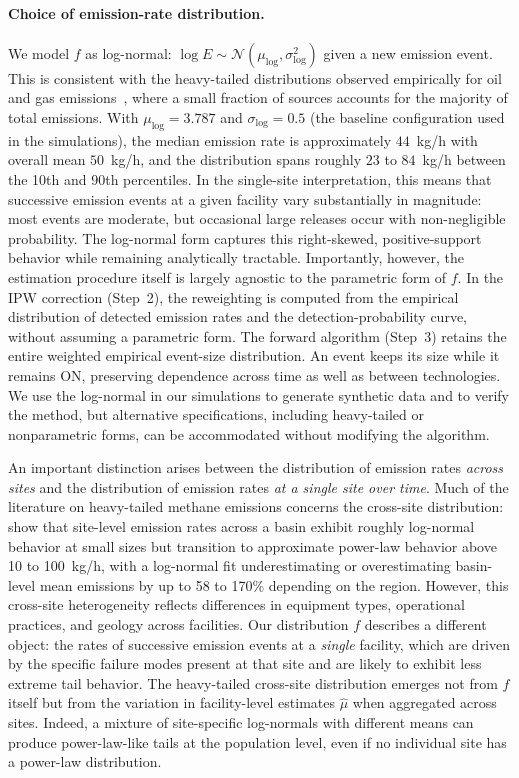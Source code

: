 \documentclass[11pt]{article}
\begin{document}
\paragraph{Choice of emission-rate distribution.}
We model $f$ as log-normal: $\log E \sim \mathcal{N}(\mu_{\log}, \sigma_{\log}^2)$ given a new emission event. This is consistent with the heavy-tailed distributions observed empirically for oil and gas emissions~\citep{Brandt2016, ZavalaAraiza2015}, where a small fraction of sources accounts for the majority of total emissions. With $\mu_{\log} = 3.787$ and $\sigma_{\log} = 0.5$ (the baseline configuration used in the simulations), the median emission rate is approximately $44$~kg/h with overall mean $50$~kg/h, and the distribution spans roughly $23$ to $84$~kg/h between the 10th and 90th percentiles. In the single-site interpretation, this means that successive emission events at a given facility vary substantially in magnitude: most events are moderate, but occasional large releases occur with non-negligible probability. The log-normal form captures this right-skewed, positive-support behavior while remaining analytically tractable. Importantly, however, the estimation procedure itself is largely agnostic to the parametric form of $f$. In the IPW correction (Step~2), the reweighting is computed from the empirical distribution of detected emission rates and the detection-probability curve, without assuming a parametric form. The forward algorithm (Step~3) retains the entire weighted empirical event-size distribution. An event keeps its size while it remains ON, preserving dependence across time as well as between technologies. We use the log-normal in our simulations to generate synthetic data and to verify the method, but alternative specifications, including heavy-tailed or nonparametric forms, can be accommodated without modifying the algorithm.

An important distinction arises between the distribution of emission rates \emph{across sites} and the distribution of emission rates \emph{at a single site over time}. Much of the literature on heavy-tailed methane emissions concerns the cross-site distribution: \citet{Sherwin2024Nature} show that site-level emission rates across a basin exhibit roughly log-normal behavior at small sizes but transition to approximate power-law behavior above 10 to 100~kg/h, with a log-normal fit underestimating or overestimating basin-level mean emissions by up to 58 to 170\% depending on the region. However, this cross-site heterogeneity reflects differences in equipment types, operational practices, and geology across facilities. Our distribution $f$ describes a different object: the rates of successive emission events at a \emph{single} facility, which are driven by the specific failure modes present at that site and are likely to exhibit less extreme tail behavior. The heavy-tailed cross-site distribution emerges not from $f$ itself but from the variation in facility-level estimates $\hat{\mu}$ when aggregated across sites. Indeed, a mixture of site-specific log-normals with different means can produce power-law-like tails at the population level, even if no individual site has a power-law distribution.
\end{document}
